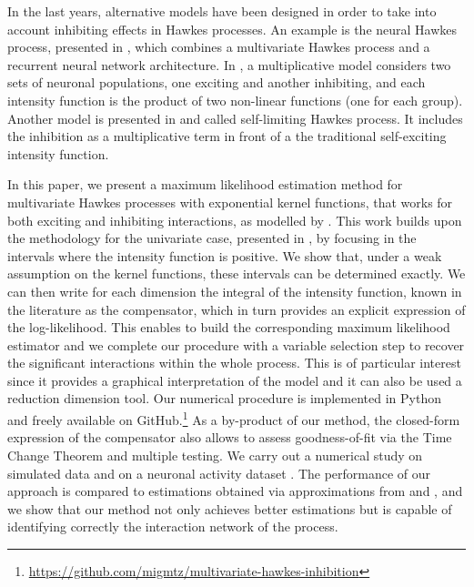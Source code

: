 In the last years,
alternative models have been designed in order to take into account inhibiting effects in Hawkes processes.
An example is the neural Hawkes process, presented in \textcite{Mei2017,Zuo2021}, which combines a multivariate Hawkes process and a recurrent neural network architecture.
In \textcite{Duval2021}, a multiplicative model considers two sets of neuronal populations, one exciting and another inhibiting, and each intensity function is the product of two non-linear functions (one for each group).
Another model is presented in \textcite{Short2020} and called self-limiting Hawkes process.
It includes the inhibition as a multiplicative term in front of a the traditional self-exciting intensity function. 

In this paper, we present a maximum likelihood estimation method for multivariate Hawkes processes with exponential kernel functions, that works for both exciting and inhibiting interactions, as modelled by \textcite{Bremaud1996, Chen2017}.
This work builds upon the methodology for the univariate case, presented in \textcite{bonnet2021}, by focusing in the intervals where the intensity function is positive.
We show that, under a weak assumption on the kernel functions, these intervals can be determined exactly.
We can then write for each dimension the integral of the intensity function, known in the literature as the compensator, which in turn provides an explicit expression of the log-likelihood.
This enables to build the corresponding maximum likelihood estimator and we complete our procedure with a variable selection step to recover the significant interactions within the whole process. This is of particular interest since it provides a graphical interpretation of the model and it can also be used a reduction dimension tool.
Our numerical procedure is implemented
in Python and freely available on GitHub.\footnote{\url{https://github.com/migmtz/multivariate-hawkes-inhibition}}
As a by-product of our method, the closed-form expression of the compensator also allows to assess goodness-of-fit via the Time Change Theorem and multiple testing.
We carry out a numerical study on simulated data and on a neuronal activity dataset \parencite{Petersen2016,Radosevic2019}.
The performance of our approach is compared to estimations obtained via approximations from \textcite{Bacry2020} and \textcite{Lemonnier2014}, and we show that our method not only achieves better estimations but is capable of identifying correctly the interaction network of the process.

